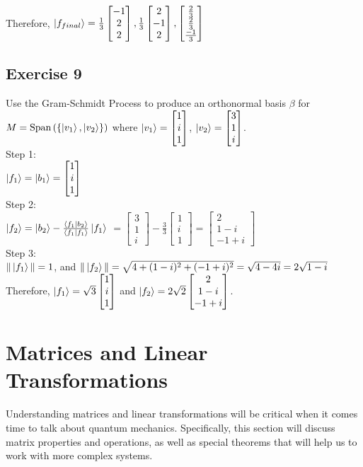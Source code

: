 \documentclass[12pt]{article}
\theoremstyle{plain}
\theoremstyle{nonumberplain}
\theoremstyle{plain}
\theoremstyle{nonumberplain}
\newcommand\1{{\bf 1}}
\newcommand{\bmat}[1]{\begin{bmatrix*} #1 \end{bmatrix*}} %
\newcommand{\<}{\left\langle}
\renewcommand{\>}{\right\rangle}
\newcommand{\inp}[2]{\left\langle#1\mid #2\right\rangle} %
\begin{document}
Therefore, $\ket{f_{final}}=\frac{1}{3}\bmat{-1 \\ 2 \\ 2}, \frac{1}{3}\bmat{2 \\ -1 \\ 2}, \bmat{\frac{2}{3} \\ \frac{2}{3} \\ \frac{-1}{3}}$


\subsection{Exercise 9}
Use the Gram-Schmidt Process to produce an orthonormal basis $\beta$ for $M=\text{Span}\left( \left\lbrace \ket{v_1},\ket{v_2} \right\rbrace \right) $ where $\ket{v_1}=\bmat{1 \\ i \\ 1}$, $\ket{v_2}=\bmat{3 \\ 1 \\ i}$. \\
Step 1: \\
$\ket{f_1}=\ket{b_1}=\bmat{1 \\ i \\ 1}$ \\
Step 2: \\
$\ket{f_2}=\ket{b_2}-\frac{\inp{f_1}{b_2}}{\inp{f_1}{f_1}}\ket{f_1}$
$=\bmat{3 \\ 1 \\ i}-\frac{3}{3}\bmat{1 \\ i \\ 1}=\bmat{2 \\ 1-i \\ -1+i}$ \\
Step 3: \\
$\Vert\ket{f_1}\Vert=1$, and $\Vert\ket{f_2}\Vert=\sqrt{4+(1-i)^2+(-1+i)^2}=\sqrt{4-4i}=2\sqrt{1-i}$ \\
Therefore, $\ket{f_1}=\sqrt{3}\bmat{1 \\ i \\ 1}$ and $\ket{f_2}=2\sqrt{2}\bmat{2 \\ 1-i \\ -1+i}$.


\section{Matrices and Linear Transformations}
Understanding matrices and linear transformations will be critical when it comes time to talk about quantum mechanics. Specifically, this section will discuss matrix properties and operations, as well as special theorems that will help us to work with more complex systems.
\end{document}
